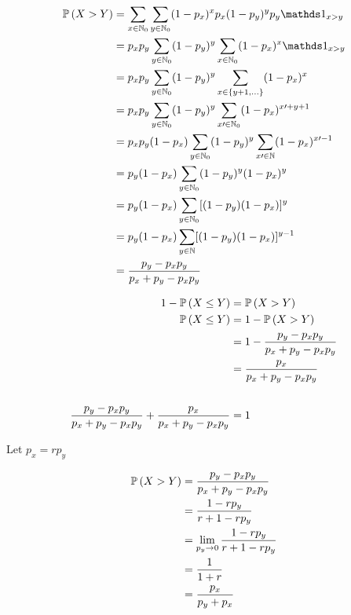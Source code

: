 \documentclass[12pt]{article}
\begin{document}
\begin{enumerate}


\begin{align*}
    \prob{X > Y} &= \sum_{x \in \naturals_0} \sum_{y \in \naturals_0} (1-p_x)^x p_x (1-p_y) ^y p_y \indic{x>y} \\ 
    &= p_xp_y \sum_{y \in \naturals_0} (1-p_y)^y  \sum_{x \in \naturals_0} (1-p_x)^x \indic{x>y} \\ 
    &= p_xp_y \sum_{y \in \naturals_0} (1-p_y)^y \sum_{x \in \braces{y+1, \ldots}} (1-p_x)^x \\ 
    &= p_xp_y \sum_{y \in \naturals_0} (1-p_y)^y \sum_{x\prime \in \naturals_0} (1-p_x)^{x\prime+y+1} \\
    &= p_xp_y(1-p_x) \sum_{y \in \naturals_0} (1-p_y)^y \sum_{x\prime \in \naturals} (1-p_x)^{x\prime-1} \\
    &= p_y(1-p_x) \sum_{y \in \naturals_0} (1-p_y)^y(1-p_x)^y \\ 
    &= p_y(1-p_x) \sum_{y \in \naturals_0} [(1-p_y)(1-p_x)]^y \\ 
    &= p_y(1-p_x) \sum_{y \in \naturals} [(1-p_y)(1-p_x)]^{y-1} \\ 
    &= \frac{p_y - p_xp_y}{p_x + p_y - p_xp_y}  
\end{align*}


\begin{align*}
    1 - \mathbb{P}\left(X \leq Y\right) &= \mathbb{P}\left(X > Y\right)  \\ 
    \mathbb{P}\left(X \leq Y\right) &= 1 - \mathbb{P}\left(X > Y\right) \\ 
    &= 1 - \frac{p_y - p_xp_y}{p_x + p_y - p_xp_y} \\
    &= \frac{p_x}{p_x + p_y - p_xp_y} \\ \\ 
    \frac{p_y - p_xp_y}{p_x + p_y - p_xp_y} + \frac{p_x}{p_x + p_y - p_xp_y} &= 1
\end{align*}


Let $p_x = rp_y$ 

\begin{align*}
    \mathbb{P}\left(X > Y\right) &= \frac{p_y - p_xp_y}{p_x + p_y - p_xp_y} \\ 
    &= \frac{1-rp_y}{r+1-rp_y} \\ 
    &= \lim_{p_y \to 0} \frac{1-rp_y}{r+1-rp_y} \\
    &= \frac{1}{1+r} \\
    &= \frac{p_x}{p_y + p_x}
\end{align*}


\end{enumerate}
\end{document}
